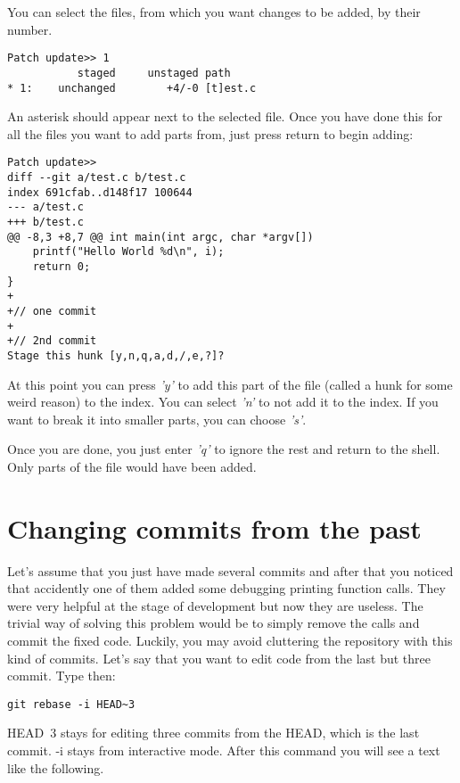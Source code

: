 You can select the files, from which you want changes to be added, by 
their number.

\begin{lstlisting}[label=git-add-i, caption='Adding parts of files to a git repository']
Patch update>> 1
           staged     unstaged path
* 1:    unchanged        +4/-0 [t]est.c
\end{lstlisting}

An asterisk should appear next to the selected file. Once you have
done this for all the files you want to add parts from, just press 
return to begin adding:

\begin{lstlisting}[label=git-add-i, caption='Adding parts of files to a git repository']
Patch update>> 
diff --git a/test.c b/test.c
index 691cfab..d148f17 100644
--- a/test.c
+++ b/test.c
@@ -8,3 +8,7 @@ int main(int argc, char *argv[])
 	printf("Hello World %d\n", i);
	return 0;
}
+
+// one commit
+
+// 2nd commit
Stage this hunk [y,n,q,a,d,/,e,?]? 
\end{lstlisting}

At this point you can press \emph{'y'} to add this part of the file (called
a hunk for some weird reason) to the index. You can select \emph{'n'} to 
not add it to the index. If you want to break it into smaller parts,
you can choose \emph{'s'}.

Once you are done, you just enter \emph{'q'} to ignore the rest and return
to the shell. Only parts of the file would have been added.
\section{Changing commits from the past}
Let's assume that you just have made several commits and after that you noticed that accidently one of them added some debugging printing function calls. They were very helpful at the stage of development but now they are useless.
The trivial way of solving this problem would be to simply remove the calls and commit the fixed code. Luckily, you may avoid  cluttering the repository with this kind of commits.
Let's say that you want to edit code from the last but three commit. Type then: 
\begin{lstlisting}
git rebase -i HEAD~3
\end{lstlisting}

HEAD~3 stays for editing three commits from the HEAD, which is the last commit. -i stays from interactive mode. After this command you will see a text like the following.

